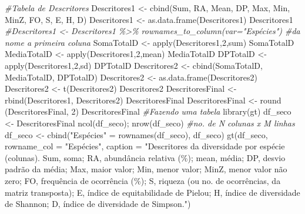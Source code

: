 \documentclass[
  letterpaper,
  DIV=11,
  numbers=noendperiod]{scrartcl}
\newenvironment{Shaded}{}{}
\newcommand{\AttributeTok}[1]{\textcolor[rgb]{0.49,0.56,0.16}{#1}}
\newcommand{\CommentTok}[1]{\textcolor[rgb]{0.38,0.63,0.69}{\textit{#1}}}
\newcommand{\DecValTok}[1]{\textcolor[rgb]{0.25,0.63,0.44}{#1}}
\newcommand{\FunctionTok}[1]{\textcolor[rgb]{0.02,0.16,0.49}{#1}}
\newcommand{\NormalTok}[1]{#1}
\newcommand{\OtherTok}[1]{\textcolor[rgb]{0.00,0.44,0.13}{#1}}
\newcommand{\StringTok}[1]{\textcolor[rgb]{0.25,0.44,0.63}{#1}}
\begin{document}
\begin{Shaded}
\begin{Highlighting}[numbers=left,,]
\CommentTok{\#Tabela de Descritores}
\NormalTok{Descritores1 }\OtherTok{\textless{}{-}} \FunctionTok{cbind}\NormalTok{(Sum, RA, Mean, DP, Max, Min, MinZ, FO, S, E, H, D)}
\NormalTok{Descritores1 }\OtherTok{\textless{}{-}} \FunctionTok{as.data.frame}\NormalTok{(Descritores1)}
\NormalTok{Descritores1}
\CommentTok{\#Descritores1 \textless{}{-} Descritores1 \%\textgreater{}\% rownames\_to\_column(var="Espécies") \#da nome a primeira coluna}
\NormalTok{SomaTotalD }\OtherTok{\textless{}{-}} \FunctionTok{apply}\NormalTok{(Descritores1,}\DecValTok{2}\NormalTok{,sum)}
\NormalTok{SomaTotalD}
\NormalTok{MediaTotalD }\OtherTok{\textless{}{-}} \FunctionTok{apply}\NormalTok{(Descritores1,}\DecValTok{2}\NormalTok{,mean)}
\NormalTok{MediaTotalD}
\NormalTok{DPTotalD }\OtherTok{\textless{}{-}} \FunctionTok{apply}\NormalTok{(Descritores1,}\DecValTok{2}\NormalTok{,sd)}
\NormalTok{DPTotalD}
\NormalTok{Descritores2 }\OtherTok{\textless{}{-}} \FunctionTok{cbind}\NormalTok{(SomaTotalD, MediaTotalD, DPTotalD)}
\NormalTok{Descritores2 }\OtherTok{\textless{}{-}} \FunctionTok{as.data.frame}\NormalTok{(Descritores2)}
\NormalTok{Descritores2 }\OtherTok{\textless{}{-}} \FunctionTok{t}\NormalTok{(Descritores2)}
\NormalTok{Descritores2}
\NormalTok{DescritoresFinal }\OtherTok{\textless{}{-}} \FunctionTok{rbind}\NormalTok{(Descritores1, Descritores2)}
\NormalTok{DescritoresFinal}
\NormalTok{DescritoresFinal }\OtherTok{\textless{}{-}} \FunctionTok{round}\NormalTok{ (DescritoresFinal, }\DecValTok{2}\NormalTok{)}
\NormalTok{DescritoresFinal}
\CommentTok{\#Fazendo uma tabela}
\FunctionTok{library}\NormalTok{(gt)}
\NormalTok{df\_seco }\OtherTok{\textless{}{-}}\NormalTok{ DescritoresFinal}
\FunctionTok{ncol}\NormalTok{(df\_seco); }\FunctionTok{nrow}\NormalTok{(df\_seco) }\CommentTok{\#no. de N colunas x M linhas}
\NormalTok{df\_seco }\OtherTok{\textless{}{-}} \FunctionTok{cbind}\NormalTok{(}\StringTok{"Espécies"} \OtherTok{=} \FunctionTok{rownames}\NormalTok{(df\_seco), df\_seco)}
\FunctionTok{gt}\NormalTok{(df\_seco, }\AttributeTok{rowname\_col =} \StringTok{"Espécies"}\NormalTok{, }\AttributeTok{caption =} \StringTok{"Descritores da diversidade por espécie (colunas). Sum, soma; RA, abundância relativa (\%); mean, média; DP, desvio padrão da média; Max, maior valor; Min, menor valor; MinZ, menor valor não zero; FO, frequência de ocorrência (\%); S, riqueza (ou no. de ocorrências, da matriz transposta); E, índice de equitabilidade de Pielou; H, índice de diversidade de Shannon; D, índice de diversidade de Simpson."}\NormalTok{)}


\end{Highlighting}
\end{Shaded}
\end{document}
